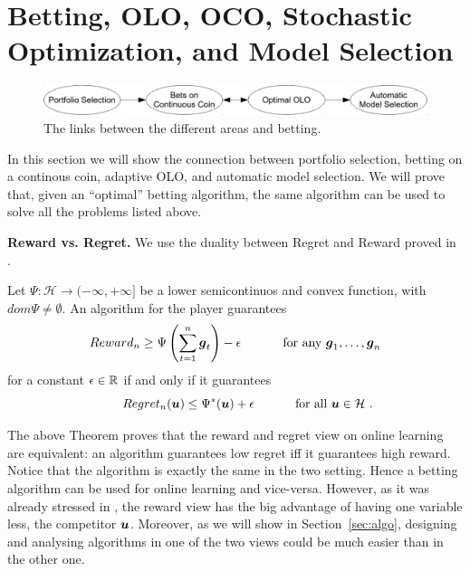 \section{Betting, OLO, OCO, Stochastic Optimization, and Model Selection}
\label{sec:appl}

\begin{figure}[t]
\centering
\includegraphics[width=.95\linewidth]{./figs/links_between_areas.pdf}
\caption{The links between the different areas and betting.}
\end{figure}

In this section we will show the connection between portfolio selection, betting on a continous coin, adaptive OLO, and automatic model selection. We will prove that, given an ``optimal'' betting algorithm, the same algorithm can be used to solve all the problems listed above.

\textbf{Reward vs. Regret.}
We use the duality between Regret and Reward proved in \citet{McMahanO14}.
\begin{theorem}
  \label{thm:rrdual}
  Let $\Psi:\mathcal{H} \rightarrow (-\infty, +\infty]$ be a lower semicontinuos and convex function, with $dom \Psi \neq \emptyset$. An
  algorithm for the player guarantees
  \[
  Reward_n \geq \Psi\left(\sum_{t=1}^n \boldsymbol{g}_t\right) - \epsilon \quad \quad \quad \textnormal{ for any } \boldsymbol{g}_1, \dots, \boldsymbol{g}_n
  \]
  for a constant $\epsilon \in \mathbb{R}$ if and only if it
  guarantees
  \begin{equation}\label{eq:regb}
  \qquad Regret_n(\boldsymbol{u}) \leq \Psi^*(\boldsymbol{u}) + \epsilon \quad \quad \quad \textnormal{ for all } \boldsymbol{u} \in \mathcal{H}~.
  \end{equation}
\end{theorem}

The above Theorem proves that the reward and regret view on online learning are equivalent: an algorithm guarantees low regret iff it guarantees high reward. Notice that the algorithm is exactly the same in the two setting.
Hence a betting algorithm can be used for online learning and vice-versa. However, as it was already stressed in \citet{McMahanO14}, the reward view has the big advantage of having one variable less, the competitor $\boldsymbol{u}$.
Moreover, as we will show in Section~\ref{sec:algo}, designing and analysing algorithms in one of the two views could be much easier than in the other one.

